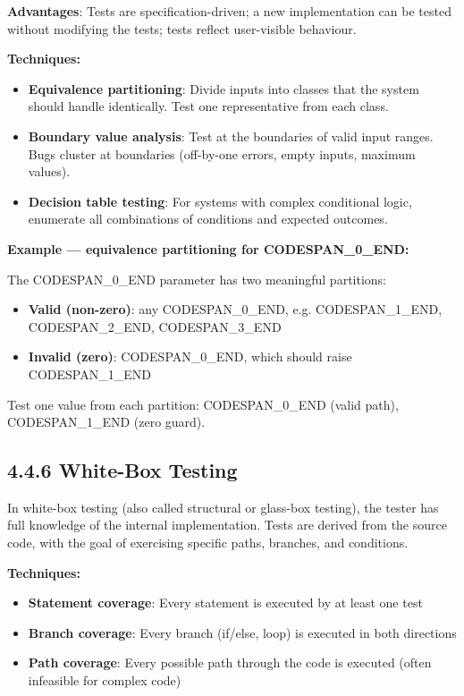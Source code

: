 \documentclass[11pt,a4paper]{book}
\begin{document}
\textbf{Advantages}: Tests are specification-driven; a new implementation can be tested without modifying the tests; tests reflect user-visible behaviour.

\textbf{Techniques:}
\begin{itemize}
  \item \textbf{Equivalence partitioning}: Divide inputs into classes that the system should handle identically. Test one representative from each class.
  \item \textbf{Boundary value analysis}: Test at the boundaries of valid input ranges. Bugs cluster at boundaries (off-by-one errors, empty inputs, maximum values).
  \item \textbf{Decision table testing}: For systems with complex conditional logic, enumerate all combinations of conditions and expected outcomes.
\end{itemize}

\textbf{Example --- equivalence partitioning for CODESPAN\_0\_END:}

The CODESPAN\_0\_END parameter has two meaningful partitions:
\begin{itemize}
  \item \textbf{Valid (non-zero)}: any CODESPAN\_0\_END, e.g. CODESPAN\_1\_END, CODESPAN\_2\_END, CODESPAN\_3\_END
  \item \textbf{Invalid (zero)}: CODESPAN\_0\_END, which should raise CODESPAN\_1\_END
\end{itemize}

Test one value from each partition: CODESPAN\_0\_END (valid path), CODESPAN\_1\_END (zero guard).

\subsection{4.4.6 White-Box Testing}

In white-box testing (also called structural or glass-box testing), the tester has full knowledge of the internal implementation. Tests are derived from the source code, with the goal of exercising specific paths, branches, and conditions.

\textbf{Techniques:}
\begin{itemize}
  \item \textbf{Statement coverage}: Every statement is executed by at least one test
  \item \textbf{Branch coverage}: Every branch (if/else, loop) is executed in both directions
  \item \textbf{Path coverage}: Every possible path through the code is executed (often infeasible for complex code)
\end{itemize}
\end{document}
